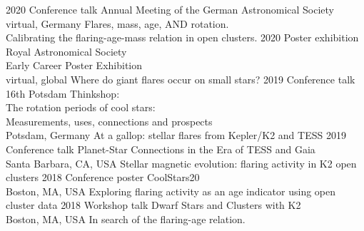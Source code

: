 \documentclass[]{k-cv} %
\begin{document}
\begin{entrylist}
\entry
{2020}
{Conference talk}
{Annual Meeting of the German Astronomical Society\vspace{-.1cm}\\\null\hfill
virtual, Germany}
{Flares, mass, age, AND rotation.\\Calibrating the flaring-age-mass relation in open clusters.}
\entry
{2020}
{Poster exhibition}
{Royal Astronomical Society\vspace{-.1cm}\\\null\hfill
Early Career Poster Exhibition\vspace{-.1cm}\\\null\hfill
virtual, global}
{Where do giant flares occur on small stars?}
\entry
{2019}
{Conference talk}
{16th Potsdam Thinkshop: \vspace{-.1cm}\\\null\hfill
The rotation periods of cool stars:\vspace{-.1cm}\\\null\hfill Measurements, uses, connections and prospects \vspace{-.1cm}\\\null\hfill
Potsdam, Germany}
{At a gallop: stellar flares from Kepler/K2 and TESS}
\entry
{2019}
{Conference talk}
{Planet-Star Connections in the Era of TESS and Gaia\vspace{-.1cm}\\\null\hfill Santa Barbara, CA, USA}
{Stellar magnetic evolution: flaring activity in K2 open clusters}
\entry
{2018}
{Conference poster}
{CoolStars20\vspace{-.1cm}\\\null\hfill Boston, MA, USA}
{Exploring flaring activity as an age indicator using open cluster data}
\entry
{2018}
{Workshop talk}
{Dwarf Stars and Clusters with K2\vspace{-.1cm}\\\null\hfill Boston, MA, USA}
{In search of the flaring-age relation.}
\end{entrylist}
\end{document}
